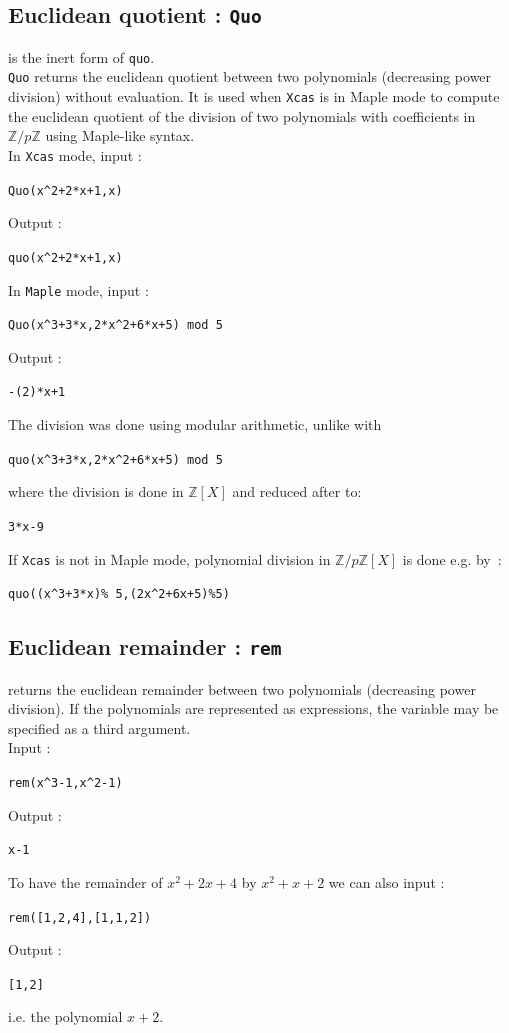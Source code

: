 \documentclass[a4paper,11pt]{book}
\newcommand{\Z}{{\mathbb{Z}}}
\begin{document}
\subsection{Euclidean quotient : {\tt Quo}}
 is the inert form of {\tt quo}.\\
{\tt Quo} returns the euclidean quotient between two polynomials
(decreasing power division) without evaluation. 
It is used when {\tt Xcas} is in Maple mode to compute
the euclidean quotient of the division of two
polynomials with coefficients in $\Z/p\Z$ using Maple-like syntax.\\
In {\tt Xcas}  mode, input :
\begin{center}{\tt Quo(x\verb|^|2+2*x+1,x)}\end{center}
Output :
\begin{center}{\tt quo(x\verb|^|2+2*x+1,x)}\end{center}
In {\tt Maple}  mode, input :
\begin{center}{\tt Quo(x\verb|^|3+3*x,2*x\verb|^|2+6*x+5) mod 5}\end{center}
Output :
\begin{center}{\tt -(2)*x+1}\end{center}
The division was done using modular arithmetic, unlike with
\begin{center}{\tt quo(x\verb|^|3+3*x,2*x\verb|^|2+6*x+5) mod 5}\end{center}
where the division is done in $\Z[X]$ and reduced after to:
\begin{center}{\tt 3*x-9}\end{center}
If {\tt Xcas} is not in Maple mode, polynomial division 
in $\Z/p\Z[X]$ is done e.g. by~:
\begin{center}
\verb|quo((x^3+3*x)% 5,(2x^2+6x+5)%5)|
\end{center}

\subsection{Euclidean remainder : {\tt rem}}
 returns the euclidean remainder between two polynomials
(decreasing power division). If the polynomials are represented as 
expressions, the variable may be specified as a third
argument.\\
Input :
\begin{center}{\tt rem(x\verb|^|3-1,x\verb|^|2-1)}\end{center}
Output :
\begin{center}{\tt x-1}\end{center}
To have the remainder of $x^2+2x+4$ by $x^2+x+2$ we can also input :
\begin{center}{\tt  rem([1,2,4],[1,1,2])}\end{center}
Output :
\begin{center}{\tt [1,2]}\end{center}
i.e. the polynomial $x+2$.
\end{document}
